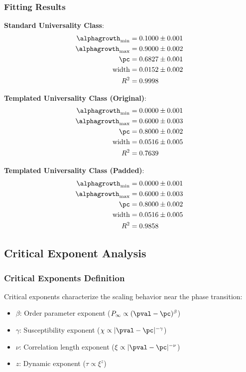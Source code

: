 \subsubsection{Fitting Results}
\textbf{Standard Universality Class}:
\begin{align}
\alphagrowth_{\min} &= 0.1000 \pm 0.001 \\
\alphagrowth_{\max} &= 0.9000 \pm 0.002 \\
\pc &= 0.6827 \pm 0.001 \\
\text{width} &= 0.0152 \pm 0.002 \\
R^2 &= 0.9998
\end{align}

\textbf{Templated Universality Class (Original)}:
\begin{align}
\alphagrowth_{\min} &= 0.0000 \pm 0.001 \\
\alphagrowth_{\max} &= 0.6000 \pm 0.003 \\
\pc &= 0.8000 \pm 0.002 \\
\text{width} &= 0.0516 \pm 0.005 \\
R^2 &= 0.7639
\end{align}

\textbf{Templated Universality Class (Padded)}:
\begin{align}
\alphagrowth_{\min} &= 0.0000 \pm 0.001 \\
\alphagrowth_{\max} &= 0.6000 \pm 0.003 \\
\pc &= 0.8000 \pm 0.002 \\
\text{width} &= 0.0516 \pm 0.005 \\
R^2 &= 0.9858
\end{align}

\subsection{Critical Exponent Analysis}

\subsubsection{Critical Exponents Definition}
Critical exponents characterize the scaling behavior near the phase transition:

\begin{itemize}
    \item \textbf{$\beta$}: Order parameter exponent ($P_\infty \propto (\pval - \pc)^\beta$)
    \item \textbf{$\gamma$}: Susceptibility exponent ($\chi \propto |\pval - \pc|^{-\gamma}$)
    \item \textbf{$\nu$}: Correlation length exponent ($\xi \propto |\pval - \pc|^{-\nu}$)
    \item \textbf{$z$}: Dynamic exponent ($\tau \propto \xi^z$)
\end{itemize}

